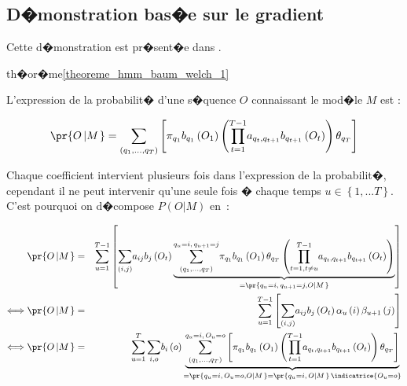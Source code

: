 \subsection{D�monstration bas�e sur le gradient}
\label{hmm_demo_gradient_par}

Cette d�monstration est pr�sent�e dans .


\begin{xdemo}{th�or�me}{\ref{theoreme_hmm_baum_welch_1}}


L'expression de la probabilit� d'une s�quence $O$ connaissant le mod�le $M$ est :%

        $$
        \pr{  O\left|  M\right.  }  =\underset{\left(  q_{1},...,q_{T}%
        \right)  }{\overset{}{{\displaystyle\sum} }}\left[  \pi_{q_{1}}b_{q_{1}}\left(  O_{1}\right)  \left(  \underset
        {t=1}{\overset{T-1}{\prod}}a_{q_{t},q_{t+1}}b_{q_{t+1}}\left(  O_{t}\right) \right)  \theta_{q_{T}}\right]
        $$

Chaque coefficient intervient plusieurs fois dans l'expression de la probabilit�, cependant il ne peut intervenir qu'une seule fois � chaque temps $u\in\left\{  1,...T\right\}  $. C'est pourquoi on d�compose $P\left(  O\left|  M\right.  \right)  $ en~:

        \begin{eqnarray}
        \pr{   O\left|  M\right.  }   &=& \underset{u=1}{\overset{T-1}{\sum} }
                \left[  \underset{\left(  i,j\right)  }{\overset{}{
            {\displaystyle\sum}}}a_{ij}b_{j}\left(  O_{t}\right)  \underset{=
                        \pr{  q_{u}=i,\,q_{u+1} =j,O\left|  M\right.  }
            }{\underbrace{\underset{\left(  q_{1},...,q_{T}\right)  }
            {\overset{q_{u}=i,\,q_{u+1}=j}{ {\displaystyle\sum} }}\pi_{q_{1}}b_{q_{1}}\left(
            O_{1}\right)  \theta_{q_{T}}\left(\underset{t=1,t\neq u}{\overset{T-1}{\prod}}a_{q_{t},q_{t+1}}b_{q_{t+1}
            }\left(  O_{t}\right)  \right)  }}\right] \nonumber\\
        \Longleftrightarrow \pr{  O\left|  M\right.  } &=& \underset{u=1}
                    {\overset{T-1}{\sum}}\left[  \underset{\left(  i,j\right)
            }{\overset{}{{\displaystyle\sum} }}a_{ij}b_{j}\left(  O_{t}\right)  \alpha_{u}
                    \left(  i\right)  \beta _{u+1}\left(  j\right)  \right]
            \label{hmm_gradient_equation_un}\\
        \Longleftrightarrow \pr{  O\left|  M\right.  }  &=& \underset
                 {u=1}{\overset{T}{\sum}}\,\underset{i,o}{\overset{}{{\displaystyle\sum}
            }}b_{i}\left(  o\right)  \underset{=\pr{  q_{u}=i,\,O_{u}=o,O\left| 
                M\right.  }  = \pr{  q_{u}=i,\,O\left|  M\right.  }
            \,\indicatrice{O_{u}=o}}{\underbrace{\underset{\left(q_{1},...,q_{T}\right)  }
            {\overset{q_{u}=i,\,O_{u}=o}{ {\displaystyle\sum}
            }}\left[  \pi_{q_{1}}b_{q_{1}}\left(  O_{1}\right)  \left(  \underset
                 {t=1}{\overset{T-1}{\prod}}a_{q_{t},q_{t+1}}b_{q_{t+1}}\left(  O_{t}\right)
            \right)  \theta_{q_{T}}\right] \label{hmm_gradient_equation_deux} }}
        \end{eqnarray}



\end{xdemo}
